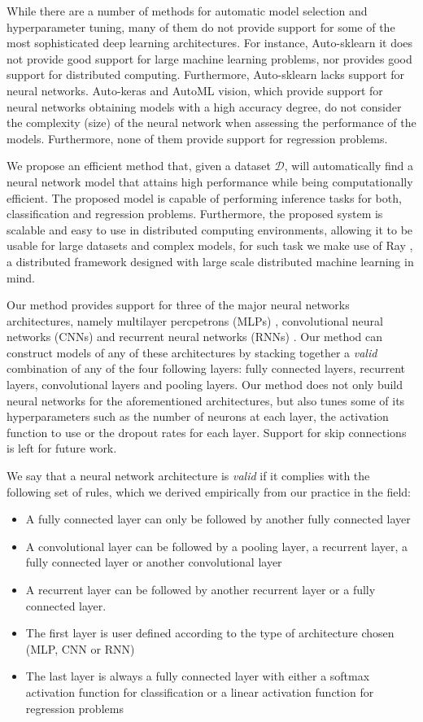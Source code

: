 \documentclass[journal]{IEEEtran}
\begin{document}
While there are a number of methods for automatic model selection and hyperparameter tuning, many of them do not provide support for some of the most sophisticated deep learning architectures. For instance, Auto-sklearn it does not provide good support for large machine learning problems, nor provides good support for distributed computing. Furthermore, Auto-sklearn lacks support for neural networks. Auto-keras and AutoML vision, which provide support for neural networks obtaining models with a high accuracy degree, do not consider the complexity (size) of the neural network when assessing the performance of the models. Furthermore, none of them provide support for regression problems.

We propose an efficient method that, given a dataset $\mathcal{D}$, will automatically find a neural network model that attains high performance while being computationally efficient. The proposed model is capable of performing inference tasks for both, classification and regression problems. Furthermore, the proposed system is scalable and easy to use in distributed computing environments, allowing it to be usable for large datasets and complex models, for such task we make use of Ray \cite{Moritz2017}, a distributed framework designed with large scale distributed machine learning in mind.

Our method provides support for three of the major neural networks architectures, namely multilayer percpetrons (MLPs) \cite{Engelbrecht2007}, convolutional neural networks (CNNs) \cite{imagenet_cvpr09} and recurrent neural networks (RNNs) \cite{dblp_lipton_2015}. Our method can construct models of any of these architectures by stacking together a \textit{valid} combination of any of the four following layers: fully connected layers, recurrent layers, convolutional layers and pooling layers. Our method does not only build neural networks for the aforementioned architectures, but also tunes some of its hyperparameters such as the number of neurons at each layer, the activation function to use or the dropout rates for each layer. Support for skip connections is left for future work.

We say that a neural network architecture is \textit{valid} if it complies with the following set of rules, which we derived empirically from our practice in the field:

\begin{itemize}
\item A fully connected layer can only be followed by another fully connected layer
\item A convolutional layer can be followed by a pooling layer, a recurrent layer, a fully connected layer or another convolutional layer
\item A recurrent layer can be followed by another recurrent layer or a fully connected layer.
\item The first layer is user defined according to the type of architecture chosen (MLP, CNN or RNN)
\item The last layer is always a fully connected layer with either a softmax activation function for classification or a linear activation function for regression problems
\end{itemize}
\end{document}
